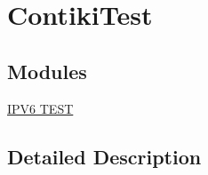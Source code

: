 \hypertarget{group__UT}{}\section{Contiki\+Test}
\label{group__UT}
\subsection*{Modules}
\begin{DoxyCompactItemize}
\item 
\hyperlink{group__IPV6}{I\+P\+V6 T\+E\+S\+T}
\end{DoxyCompactItemize}


\subsection{Detailed Description}
